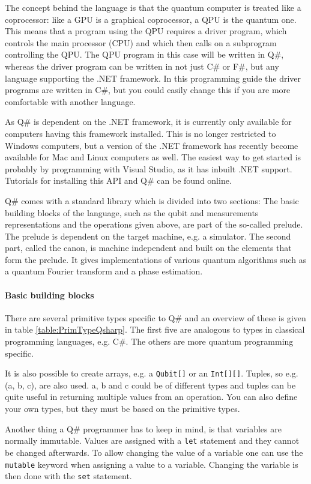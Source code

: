 The concept behind the language is that the quantum computer is treated like a coprocessor: like a GPU is a graphical coprocessor, a QPU is the quantum one. This means that a program using the QPU requires a driver program, which controls the main processor (CPU) and which then calls on a subprogram controlling the QPU. The QPU program in this case will be written in Q\#, whereas the driver program can be written in not just C\# or F\#, but any language supporting the .NET framework. In this programming guide the driver programs are written in C\#, but you could easily change this if you are more comfortable with another language.

As Q\# is dependent on the .NET framework, it is currently only available for computers having this framework installed. This is no longer restricted to Windows computers, but a version of the .NET framework has recently become available for Mac and Linux computers as well. The easiest way to get started is probably by programming with Visual Studio, as it has inbuilt .NET support. Tutorials for installing this API and Q\# can be found online. 

Q\# comes with a standard library which is divided into two sections: The basic building blocks of the language, such as the qubit and measurements representations and the operations given above, are part of the so-called prelude. The prelude is dependent on the target machine, e.g. a simulator.  The second part, called the canon, is machine independent and built on the elements that form the prelude. It gives implementations of various quantum algorithms such as a quantum Fourier transform and a phase estimation.  

\paragraph{Basic building blocks} There are several primitive types specific to Q\# and an overview of these is given in table \ref{table:PrimTypeQsharp}. The first five are analogous to types in classical programming languages, e.g. C\#. The others are more quantum programming specific. 

It is also possible to create arrays, e.g. a \texttt{Qubit[]} or an \texttt{Int[][]}. Tuples, so e.g. (a, b, c), are also used. a, b and c could be of different types and tuples can be quite useful in returning multiple values from an operation. You can also define your own types, but they must be based on the primitive types.

Another thing a Q\# programmer has to keep in mind, is that variables are normally immutable. Values are assigned with a \texttt{let} statement and they cannot be changed afterwards. To allow changing the value of a variable one can use the \texttt{mutable} keyword when assigning a value to a variable. Changing the variable is then done with the \texttt{set} statement.

